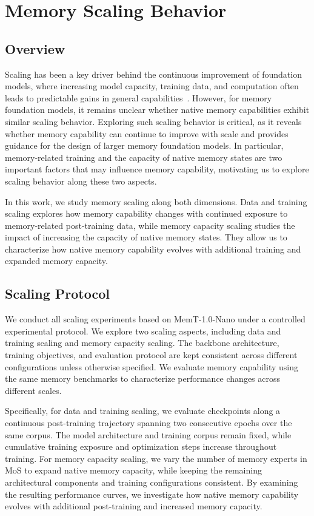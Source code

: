 \section{Memory Scaling Behavior}

\subsection{Overview}

Scaling has been a key driver behind the continuous improvement of foundation models, where increasing model capacity, training data, and computation often leads to predictable gains in general capabilities~\cite{kaplan2020scalinglawsneurallanguage}.
However, for memory foundation models, it remains unclear whether native memory capabilities exhibit similar scaling behavior.
Exploring such scaling behavior is critical, as it reveals whether memory capability can continue to improve with scale and provides guidance for the design of larger memory foundation models.
In particular, memory-related training and the capacity of native memory states are two important factors that may influence memory capability, motivating us to explore scaling behavior along these two aspects.

In this work, we study memory scaling along both dimensions.
Data and training scaling explores how memory capability changes with continued exposure to memory-related post-training data, while memory capacity scaling studies the impact of increasing the capacity of native memory states.
They allow us to characterize how native memory capability evolves with additional training and expanded memory capacity.


\subsection{Scaling Protocol}

We conduct all scaling experiments based on MemT-1.0-Nano under a controlled experimental protocol.
We explore two scaling aspects, including data and training scaling and memory capacity scaling.
The backbone architecture, training objectives, and evaluation protocol are kept consistent across different configurations unless otherwise specified.
We evaluate memory capability using the same memory benchmarks to characterize performance changes across different scales.

Specifically, for data and training scaling, we evaluate checkpoints along a continuous post-training trajectory spanning two consecutive epochs over the same corpus.
The model architecture and training corpus remain fixed, while cumulative training exposure and optimization steps increase throughout training.
For memory capacity scaling, we vary the number of memory experts in MoS to expand native memory capacity, while keeping the remaining architectural components and training configurations consistent.
By examining the resulting performance curves, we investigate how native memory capability evolves with additional post-training and increased memory capacity.

